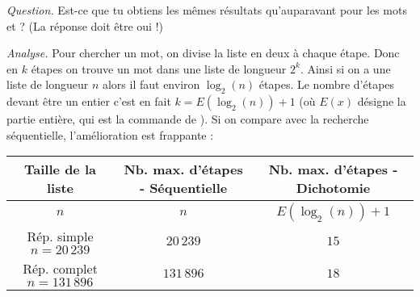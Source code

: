 \documentclass[11pt,class=report,crop=false]{standalone}
\begin{document}
\begin{activite}
\begin{enumerate}
   
  \bigskip 
     
  \emph{Question.} Est-ce que tu obtiens les mêmes résultats qu'auparavant pour les mots  et  ? (La réponse doit être \og{}oui\fg{} !)
     
  \bigskip 
  
  \emph{Analyse.} Pour chercher un mot, on divise la liste en deux à chaque étape. Donc en $k$ étapes on trouve un mot dans une liste de longueur $2^k$. Ainsi si on a une liste de longueur $n$ alors il faut environ $\log_2(n)$ étapes. Le nombre d'étapes devant être un entier c'est en fait $k = E(\log_2(n))+1$ (où $E(x)$ désigne la partie entière, qui est la commande  de \Python).
  Si on compare avec la recherche séquentielle, l'amélioration est frappante :
\begin{center}
\begin{tabular}{|c|c|c|}\hline
Taille de la liste & Nb. max. d'étapes - Séquentielle & Nb. max. d'étapes - Dichotomie \\ \hline\hline
$n$ & $n$ & $E(\log_2(n))+1$ \\ \hline
Rép. simple $n=20\,239$ & $20\,239$ & $15$ \\ \hline
Rép. complet $n = 131\,896$ & $131\,896$ & $18$ \\\hline
\end{tabular}
\end{center}    

\end{enumerate}

\end{activite}


\end{document}
